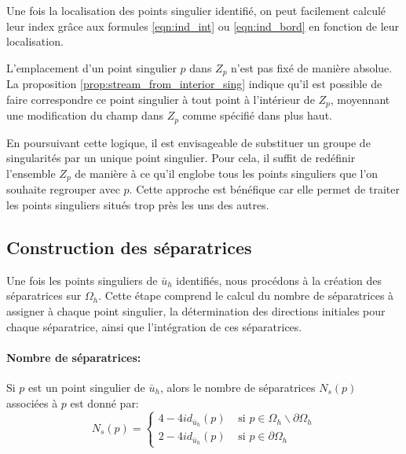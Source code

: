 Une fois la localisation des points singulier identifié, on peut facilement calculé leur index grâce aux formules \ref{eqn:ind_int} ou \ref{eqn:ind_bord} en fonction de leur localisation.

\begin{remark}
L'emplacement d'un point singulier $p$ dans $Z_p$ n'est pas fixé de manière absolue. La proposition \ref{prop:stream_from_interior_sing} indique qu'il est possible de faire correspondre ce point singulier à tout point à l'intérieur de $Z_p$, moyennant une modification du champ dans $Z_p$ comme spécifié dans plus haut.

En poursuivant cette logique, il est envisageable de substituer un groupe de singularités par un unique point singulier. Pour cela, il suffit de redéfinir l'ensemble $Z_p$ de manière à ce qu'il englobe tous les points singuliers que l'on souhaite regrouper avec $p$. Cette approche est bénéfique car elle permet de traiter les points singuliers situés trop près les uns des autres.
\end{remark}

\subsection{Construction des séparatrices}

Une fois les points singuliers de $\bar{u}_h$ identifiés, nous procédons à la création des séparatrices sur $\Omega_h$. Cette étape comprend le calcul du nombre de séparatrices à assigner à chaque point singulier, la détermination des directions initiales pour chaque séparatrice, ainsi que l'intégration de ces séparatrices.

\paragraph{Nombre de séparatrices:} Si $p$ est un point singulier de $\bar{u}_h$, alors le nombre de séparatrices $N_s(p)$ associées à $p$ est donné par:
\begin{equation}
    N_s(p) = 
    \left\{
    \begin{array}{ll}
    4-4id_{\bar{u}_h}(p) & \mbox{ si } p\in\Omega_h\backslash\partial\Omega_h\\[0.3cm]
    2-4id_{\bar{u}_h}(p) & \mbox{ si } p\in\partial\Omega_h
    \end{array}
    \right.
\end{equation}


